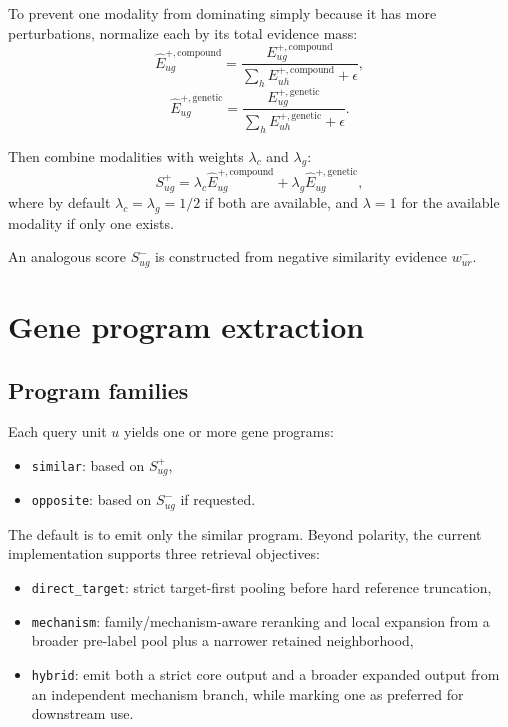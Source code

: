 \documentclass[11pt]{article}
\begin{document}
To prevent one modality from dominating simply because it has more perturbations, normalize each by its total evidence mass:
\[
\hat{E}^{+,\mathrm{compound}}_{ug} = \frac{E^{+,\mathrm{compound}}_{ug}}{\sum_h E^{+,\mathrm{compound}}_{uh} + \epsilon},
\]
\[
\hat{E}^{+,\mathrm{genetic}}_{ug} = \frac{E^{+,\mathrm{genetic}}_{ug}}{\sum_h E^{+,\mathrm{genetic}}_{uh} + \epsilon}.
\]

Then combine modalities with weights $\lambda_c$ and $\lambda_g$:
\begin{equation}
S^{+}_{ug} = \lambda_c \hat{E}^{+,\mathrm{compound}}_{ug} + \lambda_g \hat{E}^{+,\mathrm{genetic}}_{ug},
\label{eq:morph_positive_score}
\end{equation}
where by default $\lambda_c = \lambda_g = 1/2$ if both are available, and $\lambda=1$ for the available modality if only one exists.

An analogous score $S^-_{ug}$ is constructed from negative similarity evidence $w^-_{ur}$.

\section{Gene program extraction}
\subsection{Program families}
Each query unit $u$ yields one or more gene programs:
\begin{itemize}[leftmargin=2em]
\item \texttt{similar}: based on $S^+_{ug}$,
\item \texttt{opposite}: based on $S^-_{ug}$ if requested.
\end{itemize}
The default is to emit only the similar program. Beyond polarity, the current implementation supports three retrieval objectives:
\begin{itemize}[leftmargin=2em]
\item \texttt{direct\_target}: strict target-first pooling before hard reference truncation,
\item \texttt{mechanism}: family/mechanism-aware reranking and local expansion from a broader pre-label pool plus a narrower retained neighborhood,
\item \texttt{hybrid}: emit both a strict core output and a broader expanded output from an independent mechanism branch, while marking one as preferred for downstream use.
\end{itemize}
\end{document}

